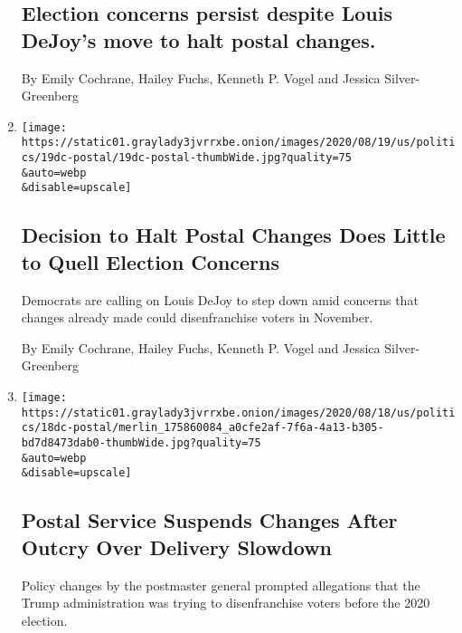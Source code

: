 \begin{enumerate}
  \hypertarget{election-concerns-persist-despite-louis-dejoys-move-to-halt-postal-changes}{%
  \subsection{Election concerns persist despite Louis DeJoy's move to
  halt postal
  changes.}\label{election-concerns-persist-despite-louis-dejoys-move-to-halt-postal-changes}}

  By Emily Cochrane, Hailey Fuchs, Kenneth P. Vogel and Jessica
  Silver-Greenberg
\item
  \href{/2020/08/19/business/economy/postal-service-changes-dejoy.html}{}

  \texttt{[image: https://static01.graylady3jvrrxbe.onion/images/2020/08/19/us/politics/19dc-postal/19dc-postal-thumbWide.jpg?quality=75\\\&auto=webp\\\&disable=upscale]}

  \hypertarget{decision-to-halt-postal-changes-does-little-to-quell-election-concerns}{%
  \subsection{Decision to Halt Postal Changes Does Little to Quell
  Election
  Concerns}\label{decision-to-halt-postal-changes-does-little-to-quell-election-concerns}}

  Democrats are calling on Louis DeJoy to step down amid concerns that
  changes already made could disenfranchise voters in November.

  By Emily Cochrane, Hailey Fuchs, Kenneth P. Vogel and Jessica
  Silver-Greenberg
\item
  \href{/2020/08/18/us/politics/postal-service-suspends-changes.html}{}

  \texttt{[image: https://static01.graylady3jvrrxbe.onion/images/2020/08/18/us/politics/18dc-postal/merlin\_175860084\_a0cfe2af-7f6a-4a13-b305-bd7d8473dab0-thumbWide.jpg?quality=75\\\&auto=webp\\\&disable=upscale]}

  \hypertarget{postal-service-suspends-changes-after-outcry-over-delivery-slowdown}{%
  \subsection{Postal Service Suspends Changes After Outcry Over Delivery
  Slowdown}\label{postal-service-suspends-changes-after-outcry-over-delivery-slowdown}}

  Policy changes by the postmaster general prompted allegations that the
  Trump administration was trying to disenfranchise voters before the
  2020 election.


\end{enumerate}
